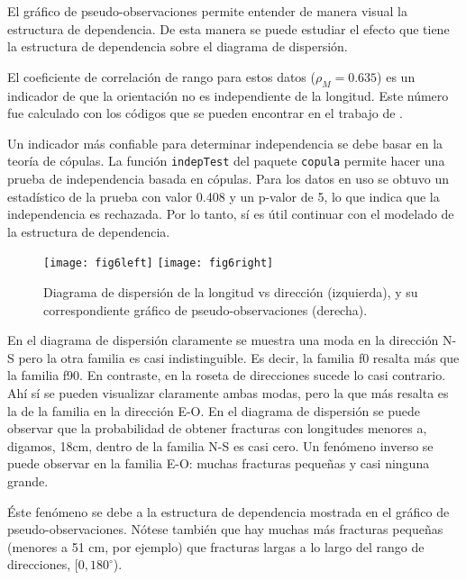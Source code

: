 El gr\'afico de pseudo-observaciones permite entender de manera visual la estructura de dependencia. De esta manera se puede estudiar el efecto que tiene la estructura de dependencia sobre el diagrama de dispersi\'on.

El coeficiente de correlaci\'on de rango para estos datos ($\rho_M = 0.635$) es un indicador de que la orientaci\'on no es independiente de la longitud. Este n\'umero fue calculado con los c\'odigos que se pueden encontrar en el trabajo de \citet{tu_study_2015}.

Un indicador m\'as confiable para determinar independencia se debe basar en la teor\'ia de c\'opulas. La funci\'on \verb|indepTest|  del paquete \verb|copula| permite hacer una prueba de independencia basada en c\'opulas. Para los datos en uso se obtuvo un estad\'istico de la prueba con valor 0.408 y un p-valor de 5, lo que indica que la independencia es rechazada. Por lo tanto, s\'i es \'util continuar con el modelado de la estructura de dependencia.


\begin{figure}[H]
	\centering
	\texttt{[image: fig6left]}
	\qquad
	\texttt{[image: fig6right]}
	\caption{Diagrama de dispersi\'on de la longitud vs direcci\'on (izquierda), y su correspondiente gr\'afico de pseudo-observaciones (derecha).}
	\label{f:scatterplot}
\end{figure}

En el diagrama de dispersi\'on claramente se muestra una moda en la direcci\'on N-S pero la otra familia es casi indistinguible. Es decir, la familia f0 resalta m\'as que la familia f90. En contraste, en la roseta de direcciones sucede lo casi contrario. Ah\'i s\'i se pueden visualizar claramente ambas modas, pero la que m\'as resalta es la de la familia en la direcci\'on E-O. En el diagrama de dispersi\'on se puede observar que la probabilidad de obtener fracturas con longitudes menores a, digamos, 18cm, dentro de la familia N-S es casi cero. Un fen\'omeno inverso se puede observar en la familia E-O: muchas fracturas peque\~nas y casi ninguna grande.

\'Este fen\'omeno se debe a la estructura de dependencia mostrada en el gr\'afico de pseudo-observaciones. N\'otese tambi\'en que hay muchas m\'as fracturas peque\~nas (menores a 51 cm, por ejemplo) que fracturas largas a lo largo del rango de direcciones, $[0, 180^\circ$).

